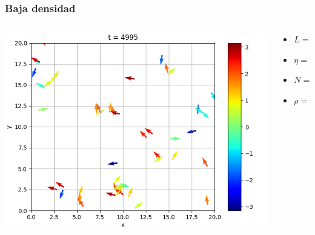 \begin{frame}
\frametitle{Baja densidad}

\begin{columns}
    \begin{column}{0.7\textwidth}
      \begin{center}

{}
{\includegraphics[width=0.7\linewidth]{animation/low_density/plot_1000.png}}

\end{center}
    \end{column}
    \begin{column}{0.3\textwidth}
\begin{center}
            \footnotesize
        \begin{itemize}
        \item \(L = 20\)
        \item \(\eta = 2.5\)
        \item \(N = 200\)
        \item \(\rho = 0.5\)
        \end{itemize}
\end{center}
    \end{column}
\end{columns}
\end{frame}

